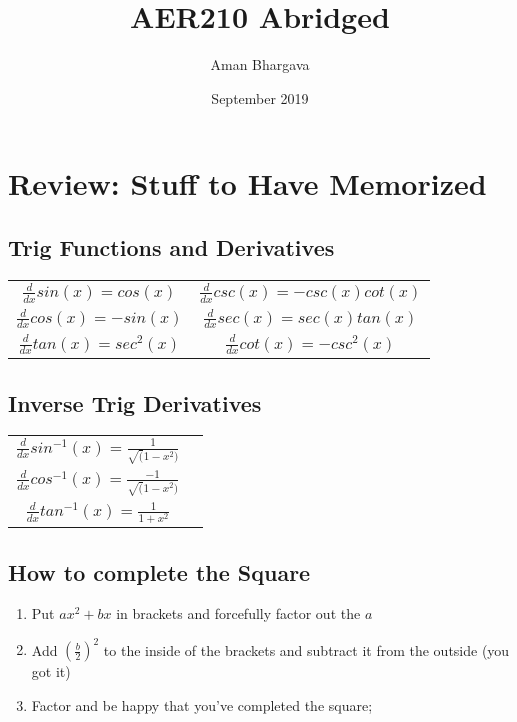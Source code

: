 \documentclass[a4paper,12pt]{report}
\begin{document}
\title{AER210 Abridged}
\author{Aman Bhargava}
\date{September 2019}
\maketitle

\tableofcontents

\pagebreak

\chapter{Review: Stuff to Have Memorized}
\section{Trig Functions and Derivatives}
\def\arraystretch{2}%
\begin{tabular}{cc}
$ \frac{d}{dx}sin(x) = cos(x) $ & $ \frac{d}{dx}csc(x) = -csc(x)cot(x) $ \\
$ \frac{d}{dx}cos(x) = -sin(x) $ & $ \frac{d}{dx}sec(x) = sec(x)tan(x) $ \\
$ \frac{d}{dx}tan(x) = sec^2(x) $ & $ \frac{d}{dx}cot(x) = -csc^2(x) $ \\
\end{tabular}

\section{Inverse Trig Derivatives}
\def\arraystretch{2}%
\begin{tabular}{cc}
$ \frac{d}{dx}sin^{-1}(x) = \frac{1}{\sqrt(1-x^2)} $ \\
$ \frac{d}{dx}cos^{-1}(x) = \frac{-1}{\sqrt(1-x^2)} $ \\
$ \frac{d}{dx}tan^{-1}(x) = \frac{1}{1+x^2} $ \\
\end{tabular}

\section{How to complete the Square}
\begin{enumerate}
\item Put $ax^2 + bx$ in brackets and forcefully factor out the $a$
\item Add $ ( \frac{b}{2})^2$ to the inside of the brackets and subtract it from the outside (you got it)
\item Factor and be happy that you've completed the square;
\end{enumerate}
\end{document}
